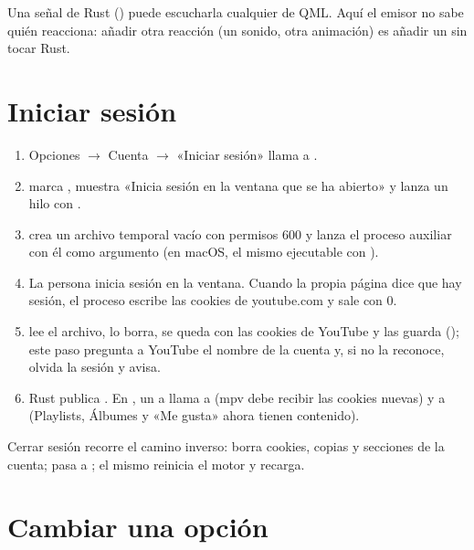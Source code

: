 \begin{idea}
Una señal de Rust (\cod{#[qsignal]}) puede escucharla cualquier  de QML. Aquí
el emisor no sabe quién reacciona: añadir otra reacción (un sonido, otra animación) es añadir
un  sin tocar Rust.
\end{idea}

\section{Iniciar sesión}

\begin{enumerate}
  \item Opciones $\rightarrow$ Cuenta $\rightarrow$ «Iniciar sesión» llama a
  .
  \item {} marca , muestra «Inicia sesión en la ventana
  que se ha abierto» y lanza un hilo con .
  \item {} crea un archivo temporal vacío con permisos 600 y lanza el proceso
  auxiliar con él como argumento (en macOS, el mismo ejecutable con ).
  \item La persona inicia sesión en la ventana. Cuando la propia página dice que hay sesión,
  el proceso escribe las cookies de youtube.com y sale con 0.
  \item {} lee el archivo, lo borra, se queda con las cookies de YouTube y las
  guarda (); este paso pregunta a YouTube el nombre de la cuenta y, si no la
  reconoce, olvida la sesión y avisa.
  \item Rust publica . En , un  a
   llama a  (mpv debe recibir las
  cookies nuevas) y a  (Playlists, Álbumes y «Me gusta» ahora tienen
  contenido).
\end{enumerate}

Cerrar sesión recorre el camino inverso:  borra cookies, copias y secciones de la
cuenta;  pasa a ; el mismo  reinicia el motor y
recarga.

\section{Cambiar una opción}


